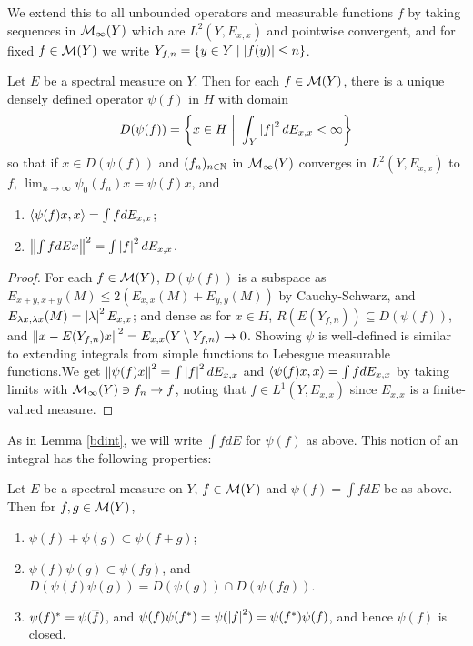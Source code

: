 \documentclass[10pt]{amsart}
\begin{document}
We extend this to all unbounded operators and measurable functions $f$ by taking sequences in $\mathcal{M}_\infty(Y)$ which are $L^2(Y, E_{x, x})$ and pointwise convergent, and for fixed $f \in \mathcal{M}(Y)$ we write $Y_{f, n} = \left\{  y \in Y \mid \left| f(y) \right| \leq n  \right\}$.
\begin{proposition}\label{unbdint}
    Let $E$ be a spectral measure on $Y$. Then for each $f \in \mathcal{M}(Y)$, there is a unique densely defined operator $\psi(f)$ in $H$ with domain
    $$
        D(\psi(f)) = \set{x \in H \ \bigg| \ \int_Y \abs{f}^2 dE_{x, x} < \infty}
    $$
    so that if $x \in D(\psi(f))$ and $(f_n)_{n \in \mathbb{N}}$ in $\mathcal{M}_\infty(Y)$ converges in $L^2(Y, E_{x, x})$ to $f$, $\lim_{n \to \infty}\psi_0(f_n)x = \psi(f)x$, and
    \begin{enumerate}
        \item $\left\langle \psi(f)x, x \right\rangle = \int f dE_{x, x}$;
        \item $\left\| \int f dE x \right\|^2 = \int \left| f \right|^2 dE_{x, x}$.
    \end{enumerate}
\end{proposition}
\begin{proof}
    For each $f \in \mathcal{M}(Y)$, $D(\psi(f))$ is a subspace as $E_{x + y, x + y}(M) \leq 2(E_{x, x}(M) + E_{y, y}(M))$ by Cauchy-Schwarz, and $E_{\lambda x, \lambda x}(M) = \left| \lambda \right|^2E_{x, x}$; and dense as for $x \in H$, $R(E(Y_{f, n})) \subseteq D(\psi(f))$, and $\left\| x - E(Y_{f, n})x \right\|^2 = E_{x, x}(Y \setminus Y_{f, n}) \to 0$. Showing $\psi$ is well-defined is similar to extending integrals from simple functions to Lebesgue measurable functions.We get $\left\| \psi(f)x \right\|^2 = \int \left| f \right|^2dE_{x, x}$ and $\left\langle \psi(f)x, x \right\rangle = \int f dE_{x, x}$ by taking limits with $\mathcal{M}_\infty(Y) \ni f_n \to f$, noting that $f \in L^1(Y, E_{x, x})$ since $E_{x, x}$ is a finite-valued measure.
\end{proof}
As in Lemma \ref{bdint}, we will write $\int f dE$ for $\psi(f)$ as above. This notion of an integral has the following properties:
\begin{proposition}\label{psiprops}
    Let $E$ be a spectral measure on $Y$, $f \in \mathcal{M}(Y)$ and $\psi(f) = \int f dE$ be as above. Then for $f, g \in \mathcal{M}(Y)$,
    \begin{enumerate}
        \item $\psi(f) + \psi(g) \subset \psi(f + g)$;
        \item $\psi(f)\psi(g) \subset \psi(fg)$, and $D(\psi(f)\psi(g)) = D(\psi(g)) \cap D(\psi(fg))$.
        \item $\psi(f)^* = \psi(\overline{f})$, and $\psi(f)\psi(f^*) = \psi(\left| f \right|^2) = \psi(f^*)\psi(f)$, and hence $\psi(f)$ is closed.
    \end{enumerate}
\end{proposition}
\end{document}
